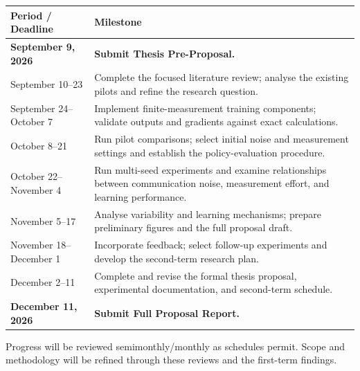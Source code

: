 \documentclass[12pt]{article}
\begin{document}
\vspace{-2pt}
\renewcommand{\arraystretch}{1.15}
\begin{tabularx}{\textwidth}{@{}>{\raggedright\arraybackslash}p{}@{\hspace{1em}}X@{}}
\toprule
\textbf{Period / Deadline} & \textbf{Milestone} \\
\midrule
\textbf{September 9, 2026} & \textbf{Submit Thesis Pre-Proposal.} \\[14pt]
September 10--23 & Complete the focused literature review; analyse the existing pilots and refine the research question. \\[14pt]
September 24--October 7 & Implement finite-measurement training components; validate outputs and gradients against exact calculations. \\[14pt]
October 8--21 & Run pilot comparisons; select initial noise and measurement settings and establish the policy-evaluation procedure. \\[14pt]
October 22--November 4 & Run multi-seed experiments and examine relationships between communication noise, measurement effort, and learning performance. \\[14pt]
November 5--17 & Analyse variability and learning mechanisms; prepare preliminary figures and the full proposal draft. \\[14pt]
November 18--December 1 & Incorporate feedback; select follow-up experiments and develop the second-term research plan. \\[14pt]
December 2--11 & Complete and revise the formal thesis proposal, experimental documentation, and second-term schedule. \\[14pt]
\textbf{December 11, 2026} & \textbf{Submit Full Proposal Report.} \\[14pt]
\bottomrule
\end{tabularx}

\vspace{4pt}
Progress will be reviewed semimonthly/monthly as schedules permit. Scope and methodology will be refined through these reviews and the first-term findings.
\end{document}
